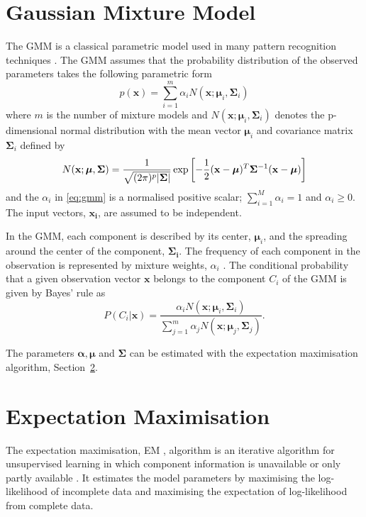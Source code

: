 \section{Gaussian Mixture Model} %
\label{sec:gaussian_mixture_model}
The GMM is a classical parametric model used in many pattern recognition techniques \cite{stylianou98}. The GMM assumes that the probability distribution of the observed parameters takes the following parametric form
\begin{equation}
	\label{eq:gmm}
	p(\mathbf{x}) = \sum_{i=1}^{m} \alpha_i N(\mathbf{x}; \boldsymbol{\mu}_i, \mathbf{\Sigma}_i)
\end{equation}
where $m$ is the number of mixture models and $N(\mathbf{x}; \boldsymbol{\mu}_i, \mathbf{\Sigma}_i)$ denotes the p-dimensional normal distribution with the mean vector $\boldsymbol{\mu}_i$ and covariance matrix $\mathbf{\Sigma}_i$ defined by
\begin{equation}
	N(\mathbf{x}; \boldsymbol{\mu}, \mathbf{\Sigma}) = \frac{1}{\sqrt{(2\pi)^p\lvert\mathbf{\Sigma}\rvert}} \exp\left[ -\frac{1}{2} (\mathbf{x} -\boldsymbol{\mu})^T \mathbf{\Sigma}^{-1} (\mathbf{x} -\boldsymbol{\mu})\right]
\end{equation}
and the $\alpha_i$ in \eqref{eq:gmm} is a normalised positive scalar; $\sum_{i=1}^{M}\alpha_i = 1$ and $\alpha_i \geq 0$. The input vectors, $\mathbf{x_i}$, are assumed to be independent.

In the GMM, each component is described by its center, $\boldsymbol{\mu}_i$, and the spreading around the center of the component, $\mathbf{\Sigma_i}$. The frequency of each component in the observation is represented by mixture weights, $\alpha_i$ \cite{stylianou98}. The conditional probability that a given observation vector $\mathbf{x}$ belongs to the component $C_i$ of the GMM is given by Bayes' rule \cite{statistikk} as
\begin{equation}
	\label{eq:bayes}
	P(C_i\vert \mathbf{x}) = \frac{\alpha_i N(\mathbf{x}; \boldsymbol{\mu}_i, \mathbf{\Sigma}_i)}{\sum_{j=1}^{m}\alpha_j N(\mathbf{x}; \boldsymbol{\mu}_j, \mathbf{\Sigma}_j)}.
\end{equation}

The parameters $\boldsymbol{\alpha}, \boldsymbol{\mu}$ and $ \mathbf{\Sigma}$ can be estimated with the expectation maximisation algorithm, Section~\ref{sec:expectation_maximisation}.


\section{Expectation Maximisation} %
\label{sec:expectation_maximisation}
The expectation maximisation, EM , algorithm is an iterative algorithm for unsupervised learning in which component information is unavailable or only partly available \cite{taletek}. It estimates the model parameters by maximising the log-likelihood of incomplete data and maximising the expectation of log-likelihood from complete data.

